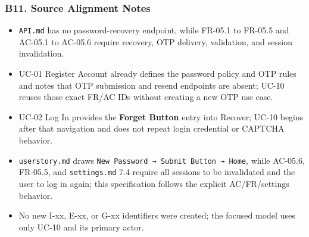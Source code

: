\documentclass[12pt]{article}
\begin{document}
\subsubsection*{B11. Source Alignment Notes}
\par\medskip

\begin{itemize}
\item \texttt{API.md} has no password-recovery endpoint, while FR-05.1 to FR-05.5 and AC-05.1 to AC-05.6 require recovery, OTP delivery, validation, and session invalidation.
\item UC-01 Register Account already defines the password policy and OTP rules and notes that OTP submission and resend endpoints are absent; UC-10 reuses those exact FR/AC IDs without creating a new OTP use case.
\item UC-02 Log In provides the \textbf{Forget Button} entry into Recover; UC-10 begins after that navigation and does not repeat login credential or CAPTCHA behavior.
\item \texttt{userstory.md} draws \texttt{New Password → Submit Button → Home}, while AC-05.6, FR-05.5, and \texttt{settings.md} 7.4 require all sessions to be invalidated and the user to log in again; this specification follows the explicit AC/FR/settings behavior.
\item No new I-xx, E-xx, or G-xx identifiers were created; the focused model uses only UC-10 and its primary actor.
\end{itemize}
\par\medskip

\par\medskip
\hypertarget{sec:ui-prototype-specimens}{}
\end{document}
